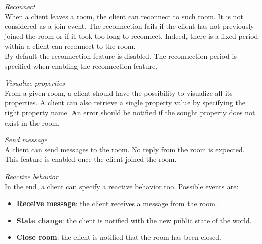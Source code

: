 \bigskip
\textit{Reconnect}
\\
When a client leaves a room, the client can reconnect to such room. It is not considered as a join event.
The reconnection fails if the client has not previously joined the room or if it took too long to reconnect. Indeed, there is a fixed period within a client can reconnect to the room.
\\
By default the reconnection feature is disabled. The reconnection period is specified when enabling the reconnection feature.

\bigskip
\textit{Visualize properties}
\\
From a given room, a client should have the possibility to visualize all its properties. A client can also retrieve a single property value by specifying the right property name. An error should be notified if the sought property does not exist in the room.

\bigskip
\textit{Send message}
\\
A client can send messages to the room. No reply from the room is expected.
This feature is enabled once the client joined the room.

\bigskip
\textit{Reactive behavior}
\\
In the end, a client can specify a reactive behavior too. Possible events are:
\begin{itemize}
\item \textbf{Receive message}: the client receives a message from the room.
\item \textbf{State change}: the client is notified with the new public state of the world.
\item \textbf{Close room}: the client is notified that the room has been closed.
\end{itemize}  
 
 
 
 
 
 
 
 
 
 

 